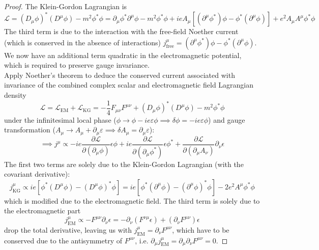 \documentclass[a4paper]{article}
\theoremstyle{new}
\begin{document}
\begin{proof}
The Klein-Gordon Lagrangian is
$$\mathcal{L}=(D_\mu\phi)^*(D^\mu\phi)-m^2\phi^*\phi=\partial_\mu\phi^*\partial^\mu\phi-m^2\phi^*\phi+ieA_\mu[(\partial^\mu\phi^*)\phi-\phi^*(\partial^\mu\phi)]+e^2A_\mu A^\mu\phi^*\phi$$
The third term is due to the interaction with the free-field Noether current (which is conserved in the absence of interactions) $j_{\text{free}}^\mu=(\partial^\mu\phi^*)\phi-\phi^*(\partial^\mu\phi)$. We now have an additional term quadratic in the electromagnetic potential, which is required to preserve gauge invariance.\\[5pt]
Apply Noether's theorem to deduce the conserved current associated with invariance of the combined complex scalar and electromagnetic field Lagrangian density
$$\mathcal{L}=\mathcal{L}_{\text{EM}}+\mathcal{L}_{\text{KG}}=-\frac{1}{4}F_{\mu\nu}F^{\mu\nu}+(D_\mu\phi)^*(D^\mu\phi)-m^2\phi^*\phi$$
under the infinitesimal local phase ($\phi\rightarrow\phi-ie\varepsilon\phi\implies\delta\phi=-ie\varepsilon\phi$) and gauge transformation ($A_\mu\rightarrow A_\mu+\partial_\mu\varepsilon\implies\delta A_\mu=\partial_\mu\varepsilon$):
$$\implies j^\mu\propto -ie\frac{\partial\mathcal{L}}{\partial(\partial_\mu\phi)}\epsilon\phi+ie\frac{\partial\mathcal{L}}{\partial(\partial_\mu\phi^*)}\epsilon\phi^*+\frac{\partial\mathcal{L}}{\partial(\partial_\mu A_\nu)}\partial_\nu\epsilon$$
The first two terms are solely due to the Klein-Gordon Lagrangian (with the covariant derivative):
$$j^\mu_{\text{KG}}\propto ie[\phi^*(D^\mu\phi)-(D^\mu\phi)^*\phi]=ie[\phi^*(\partial^\mu\phi)-(\partial^\mu\phi)^*\phi]-2e^2A^\mu\phi^*\phi$$
which is modified due to the electromagnetic field. The third term is solely due to the electromagnetic part
$$j^\mu_{\text{EM}}\propto -F^{\mu\nu}\partial_\nu\epsilon=-\partial_\nu(F^{\nu\mu}\epsilon)+(\partial_\nu F^{\mu\nu})\epsilon$$
drop the total derivative, leaving us with $j^\mu_{\text{EM}}=\partial_\nu F^{\mu\nu}$, which have to be conserved due to the antisymmetry of $F^{\mu\nu}$, i.e. $\partial_\mu j^\mu_{\text{EM}}=\partial_\mu\partial_\nu F^{\mu\nu}=0$.
\end{proof}


\newpage
\end{document}
